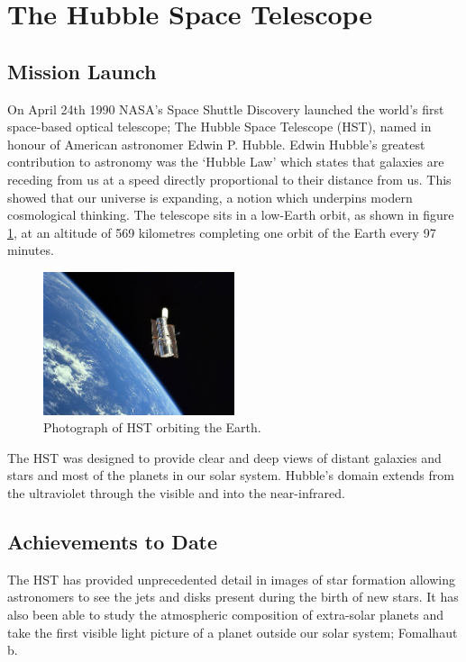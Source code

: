 
\section{The Hubble Space Telescope} %
	\label{sec:the_hubble_space_telescope}
	
	\subsection{Mission Launch} %
		\label{ssub:mission_launch}
		On April 24th 1990 NASA’s Space Shuttle Discovery launched the world’s first space-based optical telescope; The Hubble Space Telescope (HST), named in honour of American astronomer Edwin P. Hubble. Edwin Hubble’s greatest contribution to astronomy was the ‘Hubble Law’ which states that galaxies are receding from us at a speed directly proportional to their distance from us. This showed that our universe is expanding, a notion which underpins modern cosmological thinking. The telescope sits in a low-Earth orbit, as shown in figure \ref{fig:hubble_space_telescope}, at an altitude of 569 kilometres completing one orbit of the Earth every 97\,minutes\cite{Hubsite_1}.
		\begin{figure}[ht]
			\centering
			\includegraphics[width=0.5\textwidth]{../Images/Hubble_Space_Telescope.jpg}
			\caption{Photograph of HST orbiting the Earth.\label{fig:hubble_space_telescope}}
		\end{figure}

		The HST was designed to provide clear and deep views of distant galaxies and stars and most of the planets in our solar system. Hubble's domain extends from the ultraviolet through the visible and into the near-infrared\cite{NASA_1}. 

	\subsection{Achievements to Date} %
		\label{ssub:achievements_to_date}
		The HST has provided unprecedented detail in images of star formation allowing astronomers to see the jets and disks present during the birth of new stars. It has also been able to study the atmospheric composition of extra-solar planets and take the first visible light picture of a planet outside our solar system; Fomalhaut b\cite{Hubsite_3}. 

